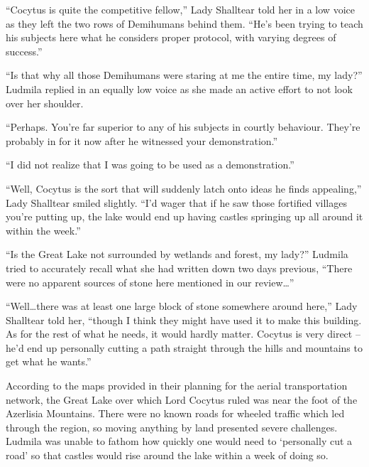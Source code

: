  

“Cocytus is quite the competitive fellow,” Lady Shalltear told her in a low voice as they left the two rows of Demihumans behind them. “He’s been trying to teach his subjects here what he considers proper protocol, with varying degrees of success.”

 

“Is that why all those Demihumans were staring at me the entire time, my lady?” Ludmila replied in an equally low voice as she made an active effort to not look over her shoulder.

 

“Perhaps. You’re far superior to any of his subjects in courtly behaviour. They’re probably in for it now after he witnessed your demonstration.”

 

“I did not realize that I was going to be used as a demonstration.”

 

“Well, Cocytus is the sort that will suddenly latch onto ideas he finds appealing,” Lady Shalltear smiled slightly. “I’d wager that if he saw those fortified villages you’re putting up, the lake would end up having castles springing up all around it within the week.”

 

“Is the Great Lake not surrounded by wetlands and forest, my lady?” Ludmila tried to accurately recall what she had written down two days previous, “There were no apparent sources of stone here mentioned in our review…”

 

“Well…there was at least one large block of stone somewhere around here,” Lady Shalltear told her, “though I think they might have used it to make this building. As for the rest of what he needs, it would hardly matter. Cocytus is very direct – he’d end up personally cutting a path straight through the hills and mountains to get what he wants.”

 

According to the maps provided in their planning for the aerial transportation network, the Great Lake over which Lord Cocytus ruled was near the foot of the Azerlisia Mountains. There were no known roads for wheeled traffic which led through the region, so moving anything by land presented severe challenges. Ludmila was unable to fathom how quickly one would need to ‘personally cut a road’ so that castles would rise around the lake within a week of doing so.

